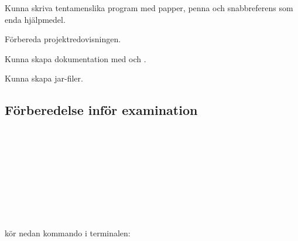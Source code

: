 
\ifPreSolution

\Exercise{\ExeWeekTHIRTEEN}\label{exe:W13}
\begin{Goals}
\item Kunna skriva tentamenslika program med papper, penna och snabbreferens som enda hjälpmedel.
\item Förbereda projektredovisningen.
\item Kunna skapa dokumentation med  och .
\item Kunna skapa jar-filer.
\end{Goals}


\else

\ExerciseSolution{\ExeWeekTHIRTEEN}

\fi


\subsection{Förberedelse inför examination}





\QUESTBEGIN

\Task \what~\TODO

\SOLUTION

\TaskSolved \what~\TODO

\QUESTEND





\QUESTBEGIN

\Task \what~\TODO

\SOLUTION

\TaskSolved \what~\TODO

\QUESTEND




\QUESTBEGIN

\Task  \what~

\Subtask \TODO kör nedan kommando i terminalen:

